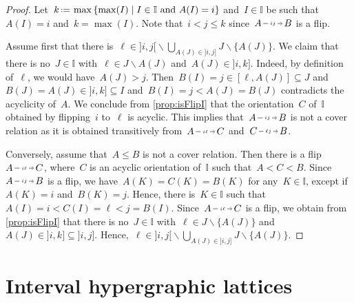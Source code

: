 \documentclass{amsart}
\theoremstyle{definition}
\newcommand{\set}[2]{\left\{ #1 \;\middle|\; #2 \right\}} %
\newcommand{\ssm}{\smallsetminus} %
\newcommand{\eqdef}{\mbox{\,\raisebox{0.2ex}{\scriptsize\ensuremath{\mathrm:}}\ensuremath{=}\,}} %
\newcommand{\II}{\mathbb I} %
\newcommand{\flip}[4]{\ensuremath{#1 \, \begin{tikzpicture}[scale=1,baseline=-.1cm] \path[->]  (0,0) edge node[fill=white,inner sep=2pt, font=\tiny ] {$#2#3$} (.7,0); \end{tikzpicture} \, #4}}
\begin{document}
\begin{proof}
Let~$k \eqdef \max\set{\max(I)}{I \in \II \text{ and } A(I) = i}$ and~$I \in \II$ be such that~$A(I) = i$ and~${k = \max(I)}$.
Note that~$i < j \le k$ since~$\flip{A}{i}{j}{B}$ is a flip.

Assume first that there is~$\ell \in {]i,j[} \ssm \bigcup_{A(J) \in {]i,j]}} J \ssm \{A(J)\}$.
We claim that there is no~$J \in \II$ with~$\ell \in J \ssm A(J)$ and~$A(J) \in {]i,k]}$.
Indeed, by definition of~$\ell$, we would have~$A(J) > j$.
Then~$B(I) = j \in [\ell, A(J)] \subseteq J$ and~$B(J) = A(J) \in {]i,k]} \subseteq I$ and~$B(I) = j < A(J) = B(J)$ contradicts the acyclicity of~$A$.
We conclude from \cref{prop:isFlipI} that the orientation~$C$ of~$\II$ obtained by flipping~$i$ to~$\ell$ is acyclic.
This implies that~$\flip{A}{i}{j}{B}$ is not a cover relation as it is obtained transitively from~$\flip{A}{i}{\ell}{C}$ and~$\flip{C}{\ell}{j}{B}$.

Conversely, assume that~$A \le B$ is not a cover relation.
Then there is a flip~$\flip{A}{i}{\ell}{C}$, where~$C$ is an acyclic orientation of~$\II$ such that~$A < C < B$.
Since~$\flip{A}{i}{j}{B}$ is a flip, we have~${A(K) = C(K) = B(K)}$ for any~$K \in \II$, except if~$A(K) = i$ and~$B(K) = j$.
Hence, there is~$K \in \II$ such that~$A(I) = i < C(I) = \ell < j = B(I)$.
Since~$\flip{A}{i}{\ell}{C}$ is a flip, we obtain from \cref{prop:isFlipI} that there is no~$J \in \II$ with~$\ell \in J \ssm \{A(J)\}$ and~$A(J) \in {]i,k]} \subseteq {]i,j]}$.
Hence,~$\ell \in {]i,j[} \ssm \bigcup_{A(J) \in {]i,j]}} J \ssm \{A(J)\}$.
\end{proof}


\pagebreak
\section{Interval hypergraphic lattices}
\label{sec:LatticeI}
\end{document}
